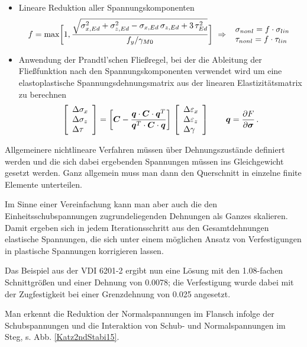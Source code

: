 \begin{itemize}
  \item Lineare Reduktion aller Spannungskomponenten
\begin{align}
f = \text{max} \bigg[ 1, \frac{\sqrt{\sigma_{x,Ed}^2 + \sigma_{z,Ed}^2- \sigma_{x,Ed}\,\sigma_{z,Ed} + 3\,\tau_{Ed}^2}}{f_y/\gamma_{M0}} \bigg]\,\, \Rightarrow\,\, \barr{l} \sigma_{nonl} = f \cdot \sigma_{lin} \\ \tau_{nonl} = f \cdot \tau_{lin} \earr
\end{align}	 	
  \item Anwendung der Prandtl'schen Flie{\ss}regel, bei der die Ableitung der Flie{\ss}funktion nach den Spannungskomponenten verwendet wird um eine elastoplastische Spannungsdehnungsmatrix aus der linearen Elastizit\"{a}tsmatrix zu berechnen
\begin{align}
\left[\barr{l} \Delta \sigma_x \\  \Delta \sigma_z \\  \Delta \tau \earr\right] = \bigg[ \vek C - \frac{\vek q \cdot \vek C \cdot \vek q^T}{\vek q^T \cdot \vek C \cdot \vek q} \bigg] \,\left[\barr{l} \Delta \varepsilon_x \\  \Delta \varepsilon_z \\  \Delta \gamma \earr\right] \qquad
\vek q = \frac{\partial F}{\partial \vek \sigma}\,.
\end{align}
\end{itemize}
Allgemeinere nichtlineare Verfahren m\"{u}ssen \"{u}ber Dehnungszust\"{a}nde definiert werden und die sich dabei ergebenden Spannungen m\"{u}ssen ins Gleichgewicht gesetzt werden. Ganz allgemein muss man dann den Querschnitt in einzelne finite Elemente unterteilen.

Im Sinne einer Vereinfachung kann man aber auch die den Einheitsschubspannungen zugrundeliegenden Dehnungen als Ganzes skalieren. Damit ergeben sich in jedem Iterationsschritt aus den Gesamtdehnungen elastische Spannungen, die sich unter einem m\"{o}glichen Ansatz von Verfestigungen in plastische Spannungen korrigieren lassen.

Das Beispiel aus der VDI 6201-2 ergibt nun eine L\"{o}sung mit den 1.08-fachen Schnittgr\"{o}{\ss}en und einer Dehnung von 0.0078; die Verfestigung wurde dabei mit der Zugfestigkeit bei einer Grenzdehnung von 0.025 angesetzt.

Man erkennt die Reduktion der Normalspannungen im Flansch infolge der Schubspannungen und die Interaktion von Schub- und Normalspannungen im Steg, s. Abb. \ref{Katz2ndStabi15}.

